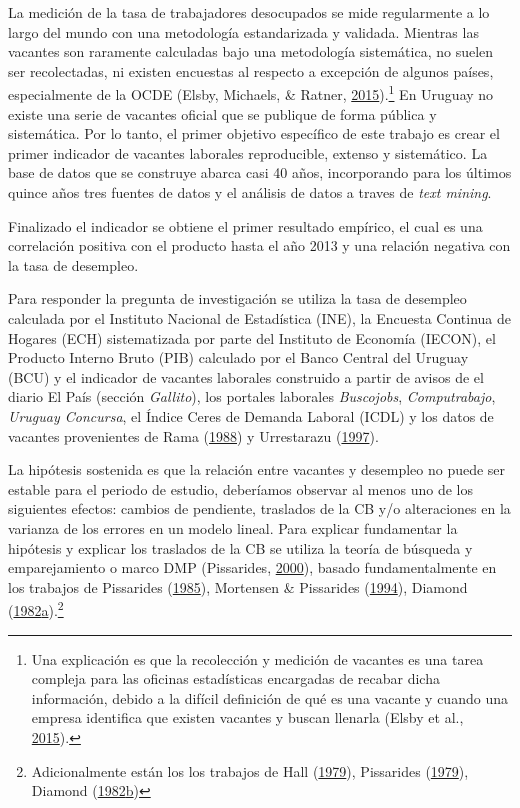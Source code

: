 \documentclass[12pt,oneside]{reedthesis}
\begin{document}
La medición de la tasa de trabajadores desocupados se mide regularmente a lo largo del mundo con una metodología estandarizada y validada. Mientras las vacantes son raramente calculadas bajo una metodología sistemática, no suelen ser recolectadas, ni existen encuestas al respecto a excepción de algunos países, especialmente de la OCDE (Elsby, Michaels, \& Ratner, \protect\hyperlink{ref-Elsby2015}{2015}).\footnote{Una explicación es que la recolección y medición de vacantes es una tarea compleja para las oficinas estadísticas encargadas de recabar dicha información, debido a la difícil definición de qué es una vacante y cuando una empresa identifica que existen vacantes y buscan llenarla (Elsby et al., \protect\hyperlink{ref-Elsby2015}{2015}).} En Uruguay no existe una serie de vacantes oficial que se publique de forma pública y sistemática. Por lo tanto, el primer objetivo específico de este trabajo es crear el primer indicador de vacantes laborales reproducible, extenso y sistemático. La base de datos que se construye abarca casi 40 años, incorporando para los últimos quince años tres fuentes de datos y el análisis de datos a traves de \emph{text mining}.

Finalizado el indicador se obtiene el primer resultado empírico, el cual es una correlación positiva con el producto hasta el año 2013 y una relación negativa con la tasa de desempleo.

Para responder la pregunta de investigación se utiliza la tasa de desempleo calculada por el Instituto Nacional de Estadística (INE), la Encuesta Continua de Hogares (ECH) sistematizada por parte del Instituto de Economía (IECON), el Producto Interno Bruto (PIB) calculado por el Banco Central del Uruguay (BCU) y el indicador de vacantes laborales construido a partir de avisos de el diario El País (sección \emph{Gallito}), los portales laborales \emph{Buscojobs}, \emph{Computrabajo}, \emph{Uruguay Concursa}, el Índice Ceres de Demanda Laboral (ICDL) y los datos de vacantes provenientes de Rama (\protect\hyperlink{ref-Rama1988}{1988}) y Urrestarazu (\protect\hyperlink{ref-Urrestarazu1997}{1997}).

La hipótesis sostenida es que la relación entre vacantes y desempleo no puede ser estable para el periodo de estudio, deberíamos observar al menos uno de los siguientes efectos: cambios de pendiente, traslados de la CB y/o alteraciones en la varianza de los errores en un modelo lineal. Para explicar fundamentar la hipótesis y explicar los traslados de la CB se utiliza la teoría de búsqueda y emparejamiento o marco DMP (Pissarides, \protect\hyperlink{ref-Pissarides2000}{2000}), basado fundamentalmente en los trabajos de Pissarides (\protect\hyperlink{ref-Pissarides1985}{1985}), Mortensen \& Pissarides (\protect\hyperlink{ref-Mortensen1994}{1994}), Diamond (\protect\hyperlink{ref-Diamond1982}{1982}\protect\hyperlink{ref-Diamond1982}{a}).\footnote{Adicionalmente están los los trabajos de Hall (\protect\hyperlink{ref-Hall1979}{1979}), Pissarides (\protect\hyperlink{ref-Pissarides1979}{1979}), Diamond (\protect\hyperlink{ref-Diamond1982B}{1982}\protect\hyperlink{ref-Diamond1982B}{b})}
\end{document}
